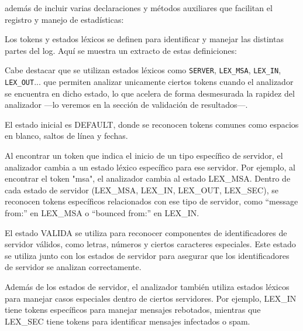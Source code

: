 \lstset{inputencoding=utf8/latin1}


además de incluir varias declaraciones y métodos auxiliares que facilitan el registro y manejo de estadísticas:

\lstset{inputencoding=utf8/latin1}


Los tokens y estados léxicos se definen para identificar y manejar las distintas partes del log. Aquí se muestra un extracto de estas definiciones:

\lstset{inputencoding=utf8/latin1}


Cabe destacar que se utilizan estados léxicos como \lstinline|SERVER|, \lstinline|LEX_MSA|, \lstinline|LEX_IN|, \lstinline|LEX_OUT|... que permiten analizar unicamente ciertos tokens cuando el analizador se encuentra en dicho estado, lo que acelera de forma desmesurada la rapidez del analizador ---lo veremos en la sección de validación de resultados---.


El estado inicial es DEFAULT, donde se reconocen tokens comunes como espacios en blanco, saltos de línea y fechas.

Al encontrar un token que indica el inicio de un tipo específico de servidor, el analizador cambia a un estado léxico específico para ese servidor. Por ejemplo, al encontrar el token "msa", el analizador cambia al estado LEX\_MSA. Dentro de cada estado de servidor (LEX\_MSA, LEX\_IN, LEX\_OUT, LEX\_SEC), se reconocen tokens específicos relacionados con ese tipo de servidor, como ``message from:'' en LEX\_MSA o ``bounced from:'' en LEX\_IN.

El estado VALIDA se utiliza para reconocer componentes de identificadores de servidor válidos, como letras, números y ciertos caracteres especiales. Este estado se utiliza junto con los estados de servidor para asegurar que los identificadores de servidor se analizan correctamente.

Además de los estados de servidor, el analizador también utiliza estados léxicos para manejar casos especiales dentro de ciertos servidores. Por ejemplo, LEX\_IN tiene tokens específicos para manejar mensajes rebotados, mientras que LEX\_SEC tiene tokens para identificar mensajes infectados o spam.

